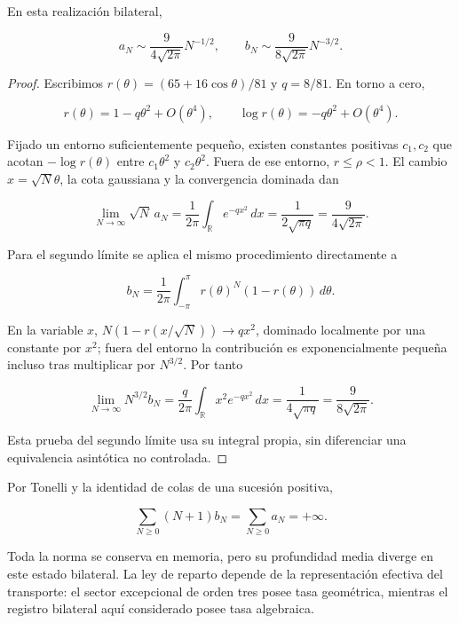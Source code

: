 \begin{theorem}
En esta realización bilateral,

\begin{equation}
\boxed{a_N\sim\frac9{4\sqrt{2\pi}}N^{-1/2},\qquad
b_N\sim\frac9{8\sqrt{2\pi}}N^{-3/2}.}
\label{x_reciprocidad:nuc03:eq:20}
\end{equation}
\end{theorem}

\begin{proof}
Escribimos \(r(\theta)=(65+16\cos\theta)/81\) y \(q=8/81\). En torno a cero,

\[
r(\theta)=1-q\theta^2+O(\theta^4),\qquad
\log r(\theta)=-q\theta^2+O(\theta^4).
\]

Fijado un entorno suficientemente pequeño, existen constantes positivas \(c_1,c_2\) que acotan \(-\log r(\theta)\) entre \(c_1\theta^2\) y \(c_2\theta^2\). Fuera de ese entorno, \(r\leq\rho<1\). El cambio \(x=\sqrt N\theta\), la cota gaussiana y la convergencia dominada dan

\[
\lim_{N\to\infty}\sqrt N\,a_N
=\frac1{2\pi}\int_{\mathbb R}e^{-qx^2}\,dx
=\frac1{2\sqrt{\pi q}}=\frac9{4\sqrt{2\pi}}.
\]

Para el segundo límite se aplica el mismo procedimiento directamente a

\[
b_N=\frac1{2\pi}\int_{-\pi}^{\pi}r(\theta)^N(1-r(\theta))\,d\theta.
\]

En la variable \(x\), \(N(1-r(x/\sqrt N))\to qx^2\), dominado localmente por una constante por \(x^2\); fuera del entorno la contribución es exponencialmente pequeña incluso tras multiplicar por \(N^{3/2}\). Por tanto

\[
\lim_{N\to\infty}N^{3/2}b_N
=\frac q{2\pi}\int_{\mathbb R}x^2e^{-qx^2}\,dx
=\frac1{4\sqrt{\pi q}}=\frac9{8\sqrt{2\pi}}.
\]

Esta prueba del segundo límite usa su integral propia, sin diferenciar una equivalencia asintótica no controlada.
\end{proof}

Por Tonelli y la identidad de colas de una sucesión positiva,

\begin{equation}
\sum_{N\geq0}(N+1)b_N=\sum_{N\geq0}a_N=+\infty.
\label{x_reciprocidad:nuc03:eq:21}
\end{equation}

Toda la norma se conserva en memoria, pero su profundidad media diverge en este estado bilateral. La ley de reparto depende de la representación efectiva del transporte: el sector excepcional de orden tres posee tasa geométrica, mientras el registro bilateral aquí considerado posee tasa algebraica.

